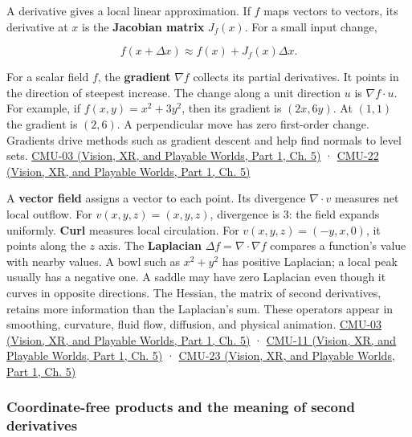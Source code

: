 A derivative gives a local linear approximation. If \(f\) maps vectors to vectors, its derivative at \(x\) is the \textbf{Jacobian matrix} \(J_f(x)\). For a small input change,

\[
f(x+\Delta x)\approx f(x)+J_f(x)\Delta x.
\]

For a scalar field \(f\), the \textbf{gradient} \(\nabla f\) collects its partial derivatives. It points in the direction of steepest increase. The change along a unit direction \(u\) is \(\nabla f\cdot u\). For example, if \(f(x,y)=x^2+3y^2\), then its gradient is \((2x,6y)\). At \((1,1)\) the gradient is \((2,6)\). A perpendicular move has zero first-order change. Gradients drive methods such as gradient descent and help find normals to level sets. \href{../07-Vision-XR-and-Playable-Worlds-P01/main.pdf\#04-visual-computing-ii-ch036-cmu-03---vector-calculus-preview}{CMU-03 (Vision, XR, and Playable Worlds, Part 1, Ch. 5)} · \href{../07-Vision-XR-and-Playable-Worlds-P01/main.pdf\#04-visual-computing-ii-ch036-cmu-22---optimization}{CMU-22 (Vision, XR, and Playable Worlds, Part 1, Ch. 5)}

A \textbf{vector field} assigns a vector to each point. Its divergence \(\nabla\cdot v\) measures net local outflow. For \(v(x,y,z)=(x,y,z)\), divergence is 3: the field expands uniformly. \textbf{Curl} measures local circulation. For \(v(x,y,z)=(-y,x,0)\), it points along the \(z\) axis. The \textbf{Laplacian} \(\Delta f=\nabla\cdot\nabla f\) compares a function's value with nearby values. A bowl such as \(x^2+y^2\) has positive Laplacian; a local peak usually has a negative one. A saddle may have zero Laplacian even though it curves in opposite directions. The Hessian, the matrix of second derivatives, retains more information than the Laplacian's sum. These operators appear in smoothing, curvature, fluid flow, diffusion, and physical animation. \href{../07-Vision-XR-and-Playable-Worlds-P01/main.pdf\#04-visual-computing-ii-ch036-cmu-03---vector-calculus-preview}{CMU-03 (Vision, XR, and Playable Worlds, Part 1, Ch. 5)} · \href{../07-Vision-XR-and-Playable-Worlds-P01/main.pdf\#04-visual-computing-ii-ch036-cmu-11---digital-geometry-processing}{CMU-11 (Vision, XR, and Playable Worlds, Part 1, Ch. 5)} · \href{../07-Vision-XR-and-Playable-Worlds-P01/main.pdf\#04-visual-computing-ii-ch036-cmu-23---physically-based-animation-and-pdes}{CMU-23 (Vision, XR, and Playable Worlds, Part 1, Ch. 5)}

\subsubsection{Coordinate-free products and the meaning of second derivatives}\label{03-visual-computing-i-ch001-coordinate-free-products-and-the-meaning-of-second-derivatives}

